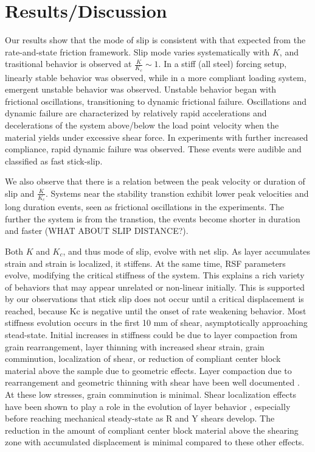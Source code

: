\documentclass[11pt]{article}
\begin{document}
\section{Results/Discussion}

Our results show that the mode of slip is consistent with that expected from the
rate-and-state friction framework. Slip mode varies systematically with $K$,
and trasitional behavior is observed at $\frac{K}{K_c} \sim 1$. In a stiff (all
steel) forcing setup, linearly stable behavior was observed, while in a
more compliant loading system, emergent unstable behavior was observed. Unstable
behavior began with frictional oscillations, transitioning to dynamic frictional
failure. Oscillations and dynamic failure are characterized by relatively rapid
accelerations and decelerations of the system above/below the load point
velocity when the material yields under excessive shear force. In experiments with
further increased compliance, rapid dynamic failure was observed. These events
were audible and classified as fast stick-slip.

We also observe that there is a relation between the peak velocity or duration
of slip and $\frac{K}{K_c}$. Systems near the stability transtion exhibit
lower peak velocities and long duration events, seen as frictional oscillations
in the experiments. The further the system is from the transtion, the events
become shorter in duration and faster (WHAT ABOUT SLIP DISTANCE?).

Both $K$ and $K_c$, and thus mode of slip, evolve with net slip. As layer
accumulates strain and strain is localized, it stiffens. At the same time, RSF
parameters evolve, modifying the critical stiffness of the system. This explains
a rich variety of behaviors that may appear unrelated or non-linear initially.
This is supported by our observations that stick slip does not occur until a
critical displacement is reached, because Kc is negative until the onset of rate
weakening behavior. Most stiffness evolution occurs in the first 10 mm of shear,
asymptotically approaching stead-state. Initial increases in stiffness could be
due to layer compaction from grain rearrangement, layer thinning with increased
shear strain, grain comminution, localization of shear, or reduction of
compliant center block material above the sample due to geometric effects. Layer
compaction due to rearrangement and geometric thinning with shear have been well
documented \cite{Scott:1994}.  At these low stresses, grain comminution is
minimal. Shear localization effects have been shown to play a role in the
evolution of layer behavior \cite{Logan:1992}, especially before reaching
mechanical steady-state as R and Y shears develop. The reduction in the amount
of compliant center block material above the shearing zone with accumulated
displacement is minimal compared to these other effects.
\end{document}
